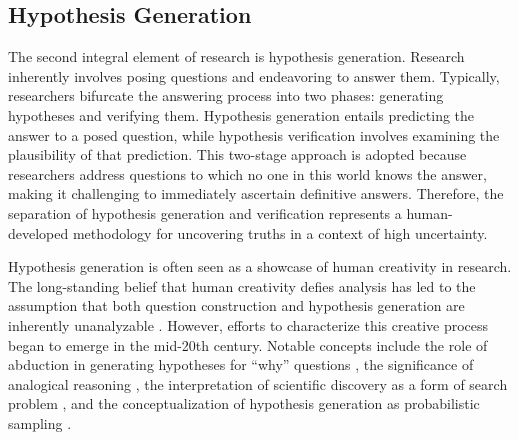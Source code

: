 


\subsection{Hypothesis Generation}

The second integral element of research is hypothesis generation. Research inherently involves posing questions and endeavoring to answer them. Typically, researchers bifurcate the answering process into two phases: generating hypotheses and verifying them. Hypothesis generation entails predicting the answer to a posed question, while hypothesis verification involves examining the plausibility of that prediction. This two-stage approach is adopted because researchers address questions to which no one in this world knows the answer, making it challenging to immediately ascertain definitive answers. Therefore, the separation of hypothesis generation and verification represents a human-developed methodology for uncovering truths in a context of high uncertainty.

Hypothesis generation is often seen as a showcase of human creativity in research. The long-standing belief that human creativity defies analysis has led to the assumption that both question construction and hypothesis generation are inherently unanalyzable \cite{sep-scientific-discovery}. However, efforts to characterize this creative process began to emerge in the mid-20th century. Notable concepts include the role of abduction in generating hypotheses for ``why'' questions \cite{hanson1965patterns,magnani2011abduction}, the significance of analogical reasoning \cite{gentner2002analogy}, the interpretation of scientific discovery as a form of search problem \cite{langley1987scientific}, and the conceptualization of hypothesis generation as probabilistic sampling \cite{dasgupta2017hypotheses}.


